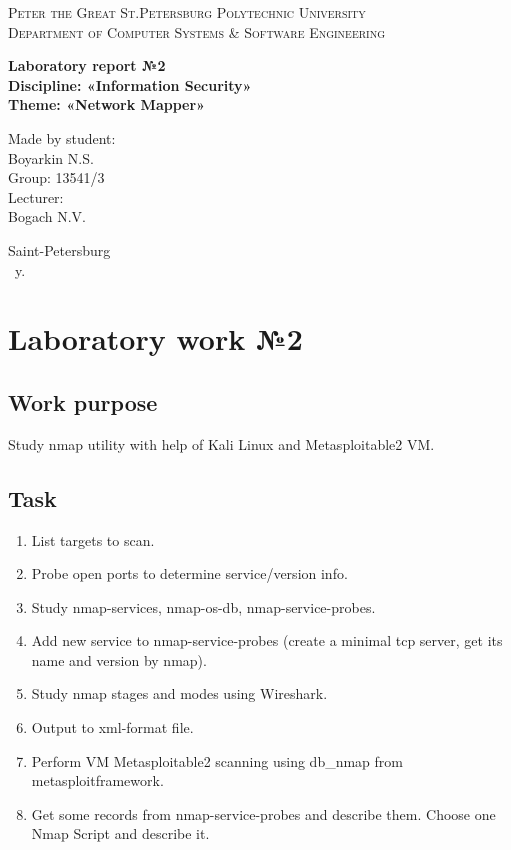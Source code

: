 \documentclass[14pt,a4paper,report]{report}
\begin{document}
\def\contentsname{Contents}

\begin{titlepage}
	\begin{center}
		\textsc{Peter the Great St.Petersburg Polytechnic University\\[5mm]
			Department of Computer Systems \& Software Engineering}
		
		\vfill
		
		\textbf{Laboratory report №2\\[3mm]
			Discipline: «Information Security»\\[3mm]
			Theme: «Network Mapper»\\[41mm]
		}
	\end{center}
	
	\hfill
	\begin{minipage}{.4\textwidth}
		Made by student:\\[2mm] 
		Boyarkin N.S.\\
		Group: 13541/3\\[5mm]
		
		Lecturer:\\[2mm] 
		Bogach N.V.
	\end{minipage}
	\vfill
	\begin{center}
		Saint-Petersburg\\ \the\year\ y.
	\end{center}
\end{titlepage}

\tableofcontents
\clearpage

\chapter{Laboratory work №2}

\section{Work purpose}

Study nmap utility with help of Kali Linux and Metasploitable2 VM.

\section{Task}

\begin{enumerate}
	\item List targets to scan.
	\item Probe open ports to determine service/version info.
	\item Study nmap-services, nmap-os-db, nmap-service-probes.
	\item Add new service to nmap-service-probes (create a minimal tcp server, get its name and version by nmap).
	\item Study nmap stages and modes using Wireshark.
	\item Output to xml-format file.
	\item Perform VM Metasploitable2 scanning using db\_nmap from metasploitframework.
	\item Get some records from nmap-service-probes and describe them. Choose one Nmap Script and describe it.
\end{enumerate}
\end{document}
